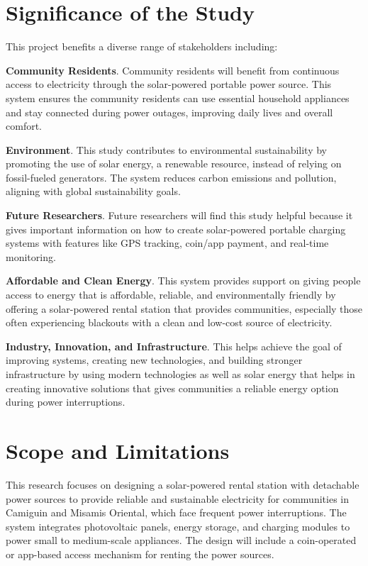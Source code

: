 {\section{Significance of the Study}

This project benefits a diverse range of stakeholders including: 

\textbf{Community Residents}. Community residents will benefit from continuous access to electricity through the solar-powered portable power source. This system ensures the community residents can use essential household appliances and stay connected during power outages, improving daily lives and overall comfort.

\textbf{Environment}. This study contributes to environmental sustainability by promoting the use of solar energy, a renewable resource, instead of relying on fossil-fueled generators. The system reduces carbon emissions and pollution, aligning with global sustainability goals.

\textbf{Future Researchers}. Future researchers will find this study helpful because it gives important information on how to create solar-powered portable charging systems with features like GPS tracking, coin/app payment, and real-time monitoring. 

\textbf{Affordable and Clean Energy}. This system provides support on giving people access to energy that is affordable, reliable, and environmentally friendly by offering a solar-powered rental station that provides communities, especially those often experiencing blackouts with a clean and low-cost source of electricity.

\textbf{Industry, Innovation, and Infrastructure}. This helps achieve the goal of improving systems, creating new technologies, and building stronger infrastructure  by using modern technologies as well as solar energy that helps in creating innovative solutions that gives communities a reliable energy option during power interruptions.


\section{Scope and Limitations}

This research focuses on designing a solar-powered rental station with detachable power sources to provide reliable and sustainable electricity for communities in Camiguin and Misamis Oriental, which face frequent power interruptions. The system integrates photovoltaic panels, energy storage, and charging modules to power small to medium-scale appliances. The design will include a coin-operated or app-based access mechanism for renting the power sources.

}
